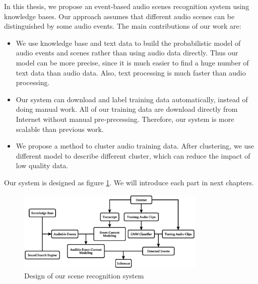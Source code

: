In this thesis, we propose an event-based audio scenes recognition system using knowledge bases. Our approach assumes that different audio scenes can be distinguished by some audio events. The main contributions of our work are:
\begin{itemize}
\item We use knowledge base and text data to build the probabilistic model of audio events and scenes rather than using audio data directly. Thus our model can be more precise, since it is much easier to find a huge number of text data than audio data. Also, text processing is much faster than audio processing.
\item Our system can download and label training data automatically, instead of doing manual work. All of our training data are download directly from Internet without manual pre-precessing. Therefore, our system is more scalable than previous work.
\item We propose a method to cluster audio training data. After clustering, we use different model to describe different cluster, which can reduce the impact of low quality data.
\end{itemize}

Our system is designed as figure \ref{fig:sys}. We will introduce each part in next chapters.
\begin{figure}[!htb]
\centering
\includegraphics[width=0.8\textwidth]{figures/all.eps}
\caption{Design of our scene recognition system}
\label{fig:sys}
\end{figure}


